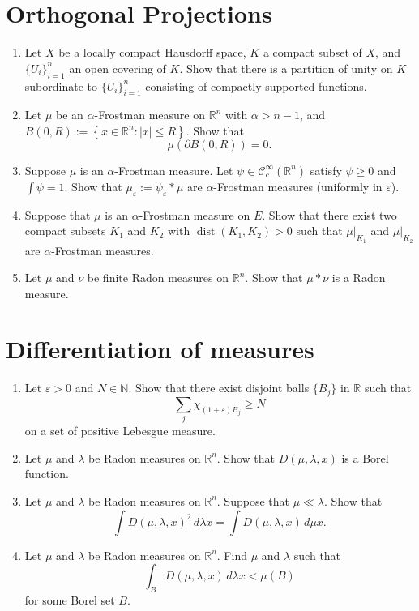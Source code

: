 \section{Orthogonal Projections}


\begin{enumerate}
    \item[1.] Let $X$ be a locally compact Hausdorff space,
    $K$ a compact subset of $X$, and $\{U_i\}_{i=1}^n$
    an open covering of $K$. Show that there is a partition
    of unity on $K$ subordinate to $\{U_i\}_{i=1}^n$ consisting
    of compactly supported functions.
    \item[2.] Let $\mu$ be an $\alpha$-Frostman measure
    on $\mathbb{R}^n$ with $\alpha>n-1$, and
    $B(0,R):=\left\{ x\in \mathbb{R}^n: \left| x \right|\le R \right\}.$
    Show that
    $$
        \mu (\partial B(0,R))=0.
    $$
    \item[3.] Suppose $\mu$ is an $\alpha$-Frostman measure. Let
    $\psi\in \mathcal{C}_c^\infty (\mathbb{R}^n)$ satisfy
    $\psi\ge 0$ and $\int \psi =1$. Show that $\mu_\varepsilon :=\psi_\varepsilon * \mu$
    are $\alpha$-Frostman measures (uniformly in $\varepsilon$).
    \item[4.] Suppose that $\mu$ is an $\alpha$-Frostman measure on $E$.
    Show that there exist two compact subsets $K_1$ and $K_2$
    with $\operatorname{dist}(K_1,K_2)>0$ such that
    $\mu|_{K_1}$ and $\mu|_{K_2}$ are $\alpha$-Frostman measures.
    \item[5.] Let $\mu$ and $\nu$ be finite Radon measures on $\mathbb{R}^n$.
    Show that $\mu*\nu$ is a Radon measure.
\end{enumerate}

\section{Differentiation of measures}

\begin{enumerate}
    \item Let $\varepsilon > 0$ and $N \in \mathbb{N}$. Show that there exist disjoint balls 
    $\{B_j\}$ in $\mathbb{R}$ such that 
    \[
        \sum_j \chi_{(1+\varepsilon)B_j} \ge N
    \]
    on a set of positive Lebesgue measure.

    \item Let $\mu$ and $\lambda$ be Radon measures on $\mathbb{R}^n$. Show that 
    $D(\mu,\lambda,x)$ is a Borel function.

    \item Let $\mu$ and $\lambda$ be Radon measures on $\mathbb{R}^n$. Suppose that 
    $\mu \ll \lambda$. Show that 
    \[
        \int D(\mu,\lambda,x)^2 \, d\lambda x
        =
        \int D(\mu,\lambda,x) \, d\mu x.
    \]

    \item Let $\mu$ and $\lambda$ be Radon measures on $\mathbb{R}^n$.  
    Find $\mu$ and $\lambda$ such that 
    \[
        \int_B D(\mu,\lambda,x) \, d\lambda x < \mu(B)
    \]
    for some Borel set $B$.

\end{enumerate}

